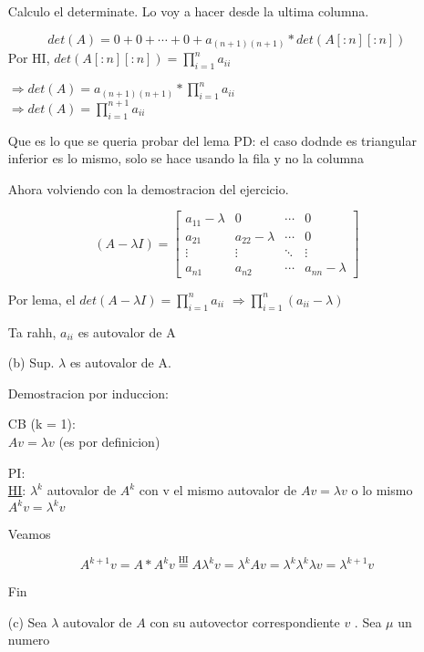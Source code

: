 \begin{itemize}
        Calculo el determinate. Lo voy a hacer desde la ultima columna. 

        $$ det(A) = 0 + 0 + \cdots + 0 + a_{(n+1)(n+1)} * det(A[:n][:n]) $$
        Por HI, $det(A[:n][:n]) = \prod_{i=1}^{n} a_{ii}$

        $\Rightarrow det(A) = a_{(n+1)(n+1)} * \prod_{i=1}^{n}a_{ii}$ \\
        $\Rightarrow det(A) = \prod_{i=1}^{n + 1}a_{ii}$

        Que es lo que se queria probar del lema
        PD: el caso dodnde es triangular inferior es lo mismo, solo se hace usando la fila y no la columna

    Ahora volviendo con la demostracion del ejercicio.
   

    \[
        (A - \lambda I) = \begin{bmatrix}
            a_{11} - \lambda & 0 & \cdots & 0 \\
            a_{21} & a_{22} - \lambda & \cdots & 0  \\
            \vdots & \vdots & \ddots & \vdots \\
            a_{n1} & a_{n2} & \cdots & a_{nn} - \lambda
        \end{bmatrix}
            \]

    Por lema, el $det(A - \lambda I) = \prod_{i=1}^{n}a_{ii}$ 
    $\Rightarrow \prod_{i=1}^{n}(a_{ii} - \lambda) $

    Ta rahh, $a_{ii}$ es autovalor de A

    \item[(b)] Sup. $\lambda$ es autovalor de A.

    Demostracion por induccion:
        
    CB (k = 1): \\  
        $Av = \lambda v$ (es por definicion)

    PI: \\

    \underline{HI}: $\lambda^{k}$ autovalor de $A^{k}$ con v el mismo autovalor de $Av = \lambda v$ o lo mismo $A^{k}v = \lambda^{k}v$

    Veamos

    $$A^{k + 1}v = A * A^{k}v \overset{\text{HI}}{=} A \lambda^{k}v = \lambda^{k} Av = \lambda^{k} \lambda^{k} \lambda v = \lambda^{k + 1} v  $$

    Fin

    \item[(c)] Sea $\lambda$ autovalor de $A$ con su autovector correspondiente $v$ . Sea $\mu$ un numero


\end{itemize}
